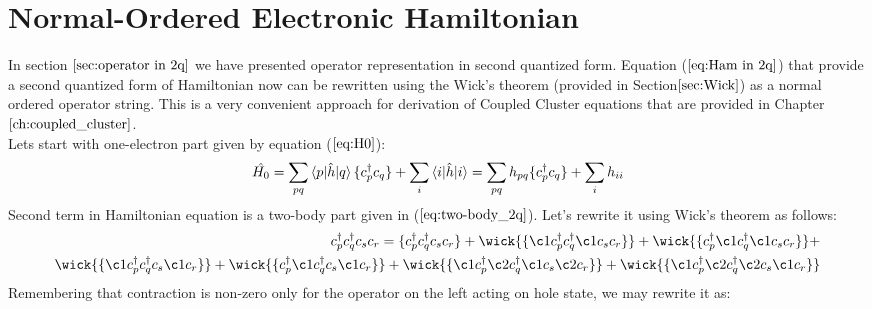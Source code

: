 \documentclass[twoside,english]{uiofysmaster}
\theoremstyle{definition}
\begin{document}
\section{Normal-Ordered Electronic Hamiltonian}
In section $\ref{sec:operator in 2q}$ we have presented operator representation in second quantized form. Equation ($\ref{eq:Ham in 2q}$) that provide a second quantized form of Hamiltonian now can be rewritten using the Wick's theorem (provided in Section$\ref{sec:Wick}$) as a normal ordered operator string. This is a very convenient approach for derivation of Coupled Cluster equations that are provided in Chapter $\ref{ch:coupled_cluster}$.  \\
Lets start with one-electron part given by equation ($\ref{eq:H0}$):
\begin{equation}
\hat{H_0}=\sum_{pq} \braket{p|\hat{h}|q} \{c_p^\dagger c_q \} + \sum_{i}\braket{i|\hat{h}|i} =\sum_{pq} h_{pq} \{c_p^\dagger c_q \} + \sum_{i}h_{ii}
\end{equation}
Second term in Hamiltonian equation is a two-body part given in ($\ref{eq:two-body_2q}$). Let's rewrite it using Wick's theorem as follows:
\begin{eqnarray}
c_p^\dagger c_q^\dagger c_s c_r= \{ c_p^\dagger c_q^\dagger c_s c_r  \} + \wick{\{ \c1 c_p^\dagger c_q^\dagger \c1 c_s c_r \}} + \wick{\{  c_p^\dagger \c1 c_q^\dagger \c1 c_s c_r \}} +\nonumber\\  \wick{\{  \c1 c_p^\dagger  c_q^\dagger  c_s \c1 c_r \}} 
+ \wick{\{  c_p^\dagger \c1 c_q^\dagger  c_s \c1 c_r \}} +\wick{\{\c1  c_p^\dagger \c2 c_q^\dagger \c1 c_s \c2 c_r \}} +\wick{\{\c1  c_p^\dagger \c2 c_q^\dagger \c2 c_s \c1 c_r \}}  
\end{eqnarray}
Remembering that contraction is non-zero only for the operator on the left acting on hole state, we may rewrite it as:
\end{document}
